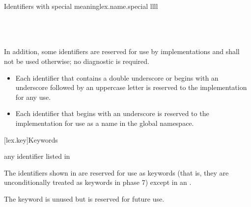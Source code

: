 \begin{multicolfloattable}{Identifiers with special meaning}{lex.name.special}
{llll}
           \\
\columnbreak
{}          \\
\columnbreak
{}          \\
\columnbreak
{}        \\
\end{multicolfloattable}

\pnum
{}%
%
%
In addition, some identifiers are reserved for use by \Cpp{}
implementations and shall
not be used otherwise; no diagnostic is required.
\begin{itemize}
\item
Each identifier that contains a double underscore
\tcode{\unun}
%
or begins with an underscore followed by
an uppercase letter
%
is reserved to the implementation for any use.
\item
Each identifier that begins with an underscore is
%
reserved to the implementation for use as a name in the global namespace.%
\end{itemize}%

[lex.key]{Keywords}

\begin{bnf}
\br
    \textnormal{any identifier listed in }\br
    \br
    \br
\end{bnf}

\pnum
{}%
The identifiers shown in  are reserved for use
as keywords (that is, they are unconditionally treated as keywords in
phase 7) except in an .
\begin{note}
The  keyword is unused but
is reserved for future use.
\end{note}

